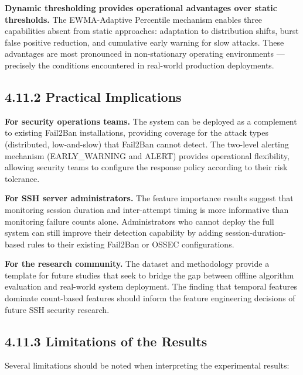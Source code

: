 \documentclass[
  a4paper]{report}
\begin{document}
\textbf{Dynamic thresholding provides operational advantages over static
thresholds.} The EWMA-Adaptive Percentile mechanism enables three
capabilities absent from static approaches: adaptation to distribution
shifts, burst false positive reduction, and cumulative early warning for
slow attacks. These advantages are most pronounced in non-stationary
operating environments --- precisely the conditions encountered in
real-world production deployments.

\subsection{4.11.2 Practical Implications}\label{practical-implications}

\textbf{For security operations teams.} The system can be deployed as a
complement to existing Fail2Ban installations, providing coverage for
the attack types (distributed, low-and-slow) that Fail2Ban cannot
detect. The two-level alerting mechanism (EARLY\_WARNING and ALERT)
provides operational flexibility, allowing security teams to configure
the response policy according to their risk tolerance.

\textbf{For SSH server administrators.} The feature importance results
suggest that monitoring session duration and inter-attempt timing is
more informative than monitoring failure counts alone. Administrators
who cannot deploy the full system can still improve their detection
capability by adding session-duration-based rules to their existing
Fail2Ban or OSSEC configurations.

\textbf{For the research community.} The dataset and methodology provide
a template for future studies that seek to bridge the gap between
offline algorithm evaluation and real-world system deployment. The
finding that temporal features dominate count-based features should
inform the feature engineering decisions of future SSH security
research.

\subsection{4.11.3 Limitations of the
Results}\label{limitations-of-the-results}

Several limitations should be noted when interpreting the experimental
results:
\end{document}
